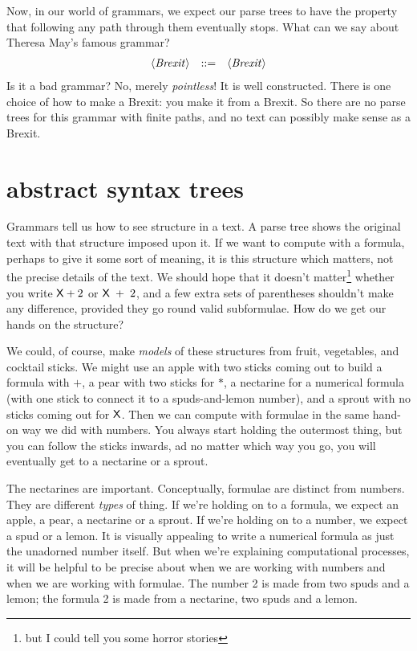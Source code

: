 \documentclass{book}
\begin{document}
Now, in our world of grammars, we expect our parse trees to have the property that following any path through them eventually stops. What can we say about Theresa May's famous grammar?
\[\begin{array}{rrl}
\langle\mathit{Brexit}\rangle & ::= & \langle\mathit{Brexit}\rangle
\end{array}\]
Is it a bad grammar? No, merely \emph{pointless}! It is well constructed. There is one choice of how to make a Brexit: you make it from a Brexit. So there are no parse trees for this grammar with finite paths, and no text can possibly make sense as a Brexit.


\section{abstract syntax trees}

\newcommand{\D}[1]{\mathtt{#1}}
\newcommand{\C}[1]{\mathtt{#1}}

Grammars tell us how to see structure in a text. A parse tree shows the original text with that structure imposed upon it. If we want to compute with a formula, perhaps to give it some sort of meaning, it is this structure which matters, not the precise details of the text. We should hope that it doesn't matter\footnote{but I could tell you some horror stories} whether you write $\mathsf{X}+2$ or $\mathsf{X}\;+\;2$, and a few extra sets of parentheses shouldn't make any difference, provided they go round valid subformulae. How do we get our hands on the structure?

We could, of course, make \emph{models} of these structures from fruit, vegetables, and cocktail sticks. We might use an apple with two sticks coming out to build a formula with $+$, a pear with two sticks for $*$, a nectarine for a numerical formula (with one stick to connect it to a spuds-and-lemon number), and a sprout with no sticks coming out for $\mathsf{X}$. Then we can compute with formulae in the same hand-on way we did with numbers. You always start holding the outermost thing, but you can follow the sticks inwards, ad no matter which way you go, you will eventually get to a nectarine or a sprout.

The nectarines are important. Conceptually, formulae are distinct from numbers. They are different \emph{types} of thing. If we're holding on to a formula, we expect an apple, a pear, a nectarine or a sprout. If we're holding on to a number, we expect a spud or a lemon. It is visually appealing to write a numerical formula as just the unadorned number itself. But when we're explaining computational processes, it will be helpful to be precise about when we are working with numbers and when we are working with formulae. The number 2 is made from two spuds and a lemon; the formula 2 is made from a nectarine, two spuds and a lemon.
\end{document}

